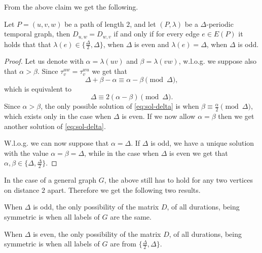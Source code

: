 \documentclass[a4paper,UKenglish,cleveref, autoref, thm-restate]{lipics-v2021}
\begin{document}
From the above claim we get the following.

\begin{claim}
	Let $P = (u, v, w)$ be a path of length $2$, and let $(P,\lambda)$ be a $\Delta$-periodic temporal graph, 
	then $D_{u,w} = D_{w,v}$
	if and only if
    for every edge $e \in E(P)$ it holds that that
	$\lambda(e) \in \{\frac{\Delta}{2}, \Delta\}$, when $\Delta$ is even and
	$\lambda(e) = \Delta$, when $\Delta$ is odd.
\end{claim}

\begin{proof}
		Let us denote with $\alpha = \lambda(uv)$ and  $\beta = \lambda(vw)$,
		w.l.o.g. we suppose also that $\alpha > \beta$.
		Since
		$\tau_v^{uw} = \tau_v^{wu}$
		we get that
		\begin{equation*}
			\Delta + \beta - \alpha \equiv \alpha - \beta \pmod\Delta,
		\end{equation*}
		which is equivalent to
		\begin{equation}\label{eq:sol-delta}
			\Delta  \equiv 2 (\alpha - \beta) \pmod\Delta.
		\end{equation}
		Since $\alpha > \beta$, the only possible solution of \cref{eq:sol-delta} is when $\beta \equiv \frac{\alpha}{2} \pmod \Delta$, which exists only in the case when $\Delta$ is even.
		If we now allow $\alpha = \beta$ then we get another solution of \cref{eq:sol-delta}.
		
		W.l.o.g. we can now suppose that $\alpha = \Delta$.
		If $\Delta$ is odd, we have a unique solution with the value $\alpha=\beta = \Delta$,
		while in the case when $\Delta$ is even we get that $\alpha, \beta \in \{\Delta, \frac{\Delta}{2}\}$. 
\end{proof}

In the case of a general graph $G$, the above still has to hold for any two vertices on distance $2$ apart.
Therefore we get the following two results.

\begin{claim}\label{claim:symmetric-odd}
	When $\Delta$ is odd, the only possibility of the matrix $D$, of all durations, being symmetric is when all labels of $G$ are the same.
\end{claim}

\begin{claim}\label{claim:symmetric-even}
	When $\Delta$ is even, the only possibility of the matrix $D$, of all durations, being symmetric is when all labels of $G$ are from $\{\frac{\Delta}{2}, \Delta\}$.
\end{claim}
\end{document}
